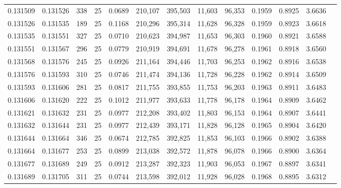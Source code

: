 \begin{tabular}{rrrrrrrrrrrrr}
0.131509 & 0.131526 &   338 &  25 &                                     0.0689 & 210,107 & 395,503 &  11,603 &  96,353 & 0.1959 & 0.8925 & 3.6636 \\
0.131526 & 0.131535 &   189 &  25 &                                     0.1168 & 210,296 & 395,314 &  11,628 &  96,328 & 0.1959 & 0.8923 & 3.6618 \\
0.131535 & 0.131551 &   327 &  25 &                                     0.0710 & 210,623 & 394,987 &  11,653 &  96,303 & 0.1960 & 0.8921 & 3.6588 \\
0.131551 & 0.131567 &   296 &  25 &                                     0.0779 & 210,919 & 394,691 &  11,678 &  96,278 & 0.1961 & 0.8918 & 3.6560 \\
0.131568 & 0.131576 &   245 &  25 &                                     0.0926 & 211,164 & 394,446 &  11,703 &  96,253 & 0.1962 & 0.8916 & 3.6538 \\
0.131576 & 0.131593 &   310 &  25 &                                     0.0746 & 211,474 & 394,136 &  11,728 &  96,228 & 0.1962 & 0.8914 & 3.6509 \\
0.131593 & 0.131606 &   281 &  25 &                                     0.0817 & 211,755 & 393,855 &  11,753 &  96,203 & 0.1963 & 0.8911 & 3.6483 \\
0.131606 & 0.131620 &   222 &  25 &                                     0.1012 & 211,977 & 393,633 &  11,778 &  96,178 & 0.1964 & 0.8909 & 3.6462 \\
0.131621 & 0.131632 &   231 &  25 &                                     0.0977 & 212,208 & 393,402 &  11,803 &  96,153 & 0.1964 & 0.8907 & 3.6441 \\
0.131632 & 0.131644 &   231 &  25 &                                     0.0977 & 212,439 & 393,171 &  11,828 &  96,128 & 0.1965 & 0.8904 & 3.6420 \\
0.131644 & 0.131664 &   346 &  25 &                                     0.0674 & 212,785 & 392,825 &  11,853 &  96,103 & 0.1966 & 0.8902 & 3.6388 \\
0.131664 & 0.131677 &   253 &  25 &                                     0.0899 & 213,038 & 392,572 &  11,878 &  96,078 & 0.1966 & 0.8900 & 3.6364 \\
0.131677 & 0.131689 &   249 &  25 &                                     0.0912 & 213,287 & 392,323 &  11,903 &  96,053 & 0.1967 & 0.8897 & 3.6341 \\
0.131689 & 0.131705 &   311 &  25 &                                     0.0744 & 213,598 & 392,012 &  11,928 &  96,028 & 0.1968 & 0.8895 & 3.6312 \\

\end{tabular}
